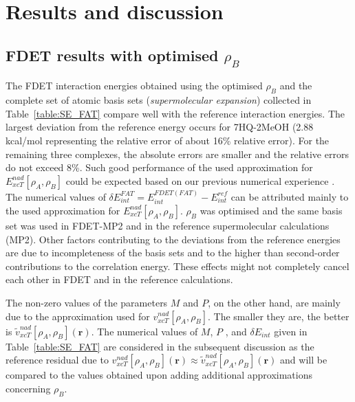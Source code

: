 \documentclass[amsmath,amssymb,preprint,aip,jcp]{revtex4-1}
\newcommand{\nr}[1]{\color{red}#1\color{black}}
\begin{document}
\section{Results and discussion}
\subsection{FDET results with optimised $\rho_B$}
The FDET interaction energies  obtained using the optimised $\rho_B$ and the complete set of atomic basis sets ({\it supermolecular expansion}) collected in Table~\ref{table:SE_FAT} compare well with the reference interaction energies.  
The largest deviation from the reference energy occurs for 7HQ-2MeOH (2.88 kcal/mol representing the relative error of about 16\% relative error). 
For the remaining three complexes, the absolute errors are smaller and the relative errors do not exceed 8\%.
Such good performance of the used approximation for $E_{xcT}^{nad}[\rho_A,\rho_B]$
could be expected based on our previous numerical experience \cite{Wesolowski2003a,Kevorkyants2006,Dulak2007a}. The numerical values of $
\delta E_{int}^{FAT}=E^{FDET(FAT)}_{int}-E_{int}^{ref}\label{eq:def_err_en}$
 can be attributed mainly to the used  approximation for $E_{xcT}^{nad}[\rho_A,\rho_B]$. 
 $\rho_B$ was optimised and the same basis set was used in \nr{FDET-MP2 } and \nr{in } the reference supermolecular calculations (MP2). 
Other factors contributing to the deviations from the reference energies are due to incompleteness of the basis sets and to the higher than second-order contributions to the correlation energy. These effects might not completely cancel each other in FDET and in the reference calculations. 

The non-zero values of  the parameters $M$ and $P$, on the other hand, \nr{are mainly due to } the approximation \nr{used for } $v_{xcT}^{nad}[\rho_A,\rho_B]$. 
The \nr{smaller } they are\nr{, } the better is $\tilde{v}_{xcT}^{nad}[\rho_A,\rho_B](\mathbf{r})$.
The numerical values of \nr{$M$, $P$ }, and $\delta E_{int}$ given in Table~\ref{table:SE_FAT} are considered in the subsequent discussion as the reference residual due to ${v}_{xcT}^{nad}[\rho_A,\rho_B](\mathbf{r})\approx\tilde{v}_{xcT}^{nad}[\rho_A,\rho_B](\mathbf{r})$ and will be compared to the values obtained upon adding additional approximations concerning  $\rho_B$.
\end{document}
